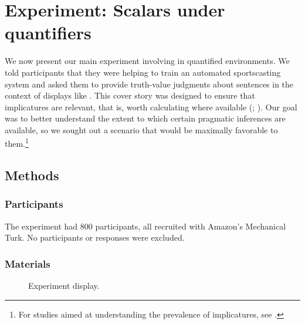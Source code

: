 \documentclass[leqno,12pt]{article}
\begin{document}

\section{Experiment: Scalars under quantifiers}\label{sec:binary}


We now present our main experiment involving  in quantified
environments. We told participants that they were helping to train an
automated sportscasting system and asked them to provide truth-value
judgments about sentences in the context of displays like
. This cover story was designed to
ensure that implicatures are relevant, that is, worth calculating
where available (;
\citealt{Clifton:Dube:2010}). Our goal was to better understand the
extent to which certain pragmatic inferences are available, so we
sought out a scenario that would be maximally favorable to
them.\footnote{For studies aimed at understanding the prevalence of
  implicatures, see \citealt{Paris:1973,Hendriks-etal:2009}.}


\subsection{Methods}


\subsubsection{Participants}

The experiment had 800 participants, all recruited with Amazon's
Mechanical Turk. No participants or responses were excluded.

\subsubsection{Materials}

\begin{figure}[t]
  \centering
  \caption{Experiment display.}
  \label{fig:binary:materials}
\end{figure}
\end{document}
